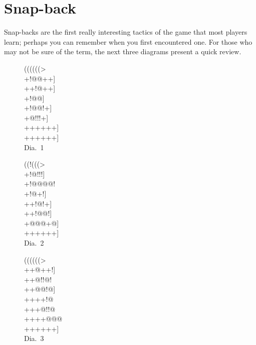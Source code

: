 \documentclass[mcrownvopaper,10pt,twopage,onecolumn,final]{memoir}
\begin{document}
\section{Snap-back}
Snap-backs are the first really interesting tactics of the game that
most players learn; perhaps you can remember when you first
encountered one. For those who may not be sure of the term, the next
three diagrams present a quick review.
\begin{figure}[ht]
    \begin{minipage}[c]{0.33\linewidth}
        \centering    
        {\gnos%
        ((((((>\\
        +!@@++]\\
        ++!@++]\\
        +!@@]\\
        +!@@!+]\\
        +@!!!+]\\
        ++++++]\\
        ++++++]\\
        }
        Dia.\ 1
    \end{minipage}%
    \begin{minipage}[c]{0.33\linewidth}
        \centering    
        {\gnos%
        ((!(((>\\
        +!@!!!]\\
        +!@@@@!\\
        +!@{\gnosw{}}+!]\\
        ++!@!+]\\
        ++!@@!]\\
        +@@@+@]\\
        ++++++]\\
        }
        Dia.\ 2
    \end{minipage}%
    \begin{minipage}[c]{0.33\linewidth}
        \centering    
        {\gnos%
        ((((((>\\
        ++@++!]\\
        ++@!!@!\\
        ++@@!@]\\
        ++++!@{\gnosw{}}\\
        +++@!!@\\
        ++++@@@\\
        ++++++]\\
        }
        Dia.\ 3
    \end{minipage}
\end{figure}
\end{document}
